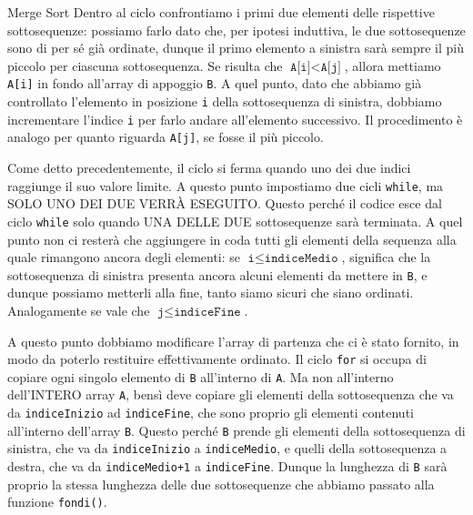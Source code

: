 \documentclass[12pt]{report}
\begin{document}
\begin{algoritmo}{Merge Sort}{}
    	Dentro al ciclo confrontiamo i primi due elementi delle rispettive sottosequenze: possiamo farlo dato che, per ipotesi induttiva, le due sottosequenze sono di per sé già ordinate, dunque il primo elemento a sinistra sarà sempre il più piccolo per ciascuna sottosequenza. Se risulta che $\texttt{A[i]} < \texttt{A[j]}$, allora mettiamo \texttt{A[i]} in fondo all'array di appoggio \texttt{B}. A quel punto, dato che abbiamo già controllato l'elemento in posizione \texttt{i} della sottosequenza di sinistra, dobbiamo incrementare l'indice \texttt{i} per farlo andare all'elemento successivo. Il procedimento è analogo per quanto riguarda \texttt{A[j]}, se fosse il più piccolo.
    	
    	Come detto precedentemente, il ciclo si ferma quando uno dei due indici raggiunge il suo valore limite. A questo punto impostiamo due cicli \texttt{while}, ma SOLO UNO DEI DUE VERRÀ ESEGUITO. Questo perché il codice esce dal ciclo \texttt{while} solo quando UNA DELLE DUE sottosequenze sarà terminata. A quel punto non ci resterà che aggiungere in coda tutti gli elementi della sequenza alla quale rimangono ancora degli elementi: se $\texttt{i} \leq \texttt{indiceMedio}$, significa che la sottosequenza di sinistra presenta ancora alcuni elementi da mettere in \texttt{B}, e dunque possiamo metterli alla fine, tanto siamo sicuri che siano ordinati. Analogamente se vale che $\texttt{j} \leq \texttt{indiceFine}$.
    	
    	A questo punto dobbiamo modificare l'array di partenza che ci è stato fornito, in modo da poterlo restituire effettivamente ordinato. Il ciclo \texttt{for} si occupa di copiare ogni singolo elemento di \texttt{B} all'interno di \texttt{A}. Ma non all'interno dell'INTERO array \texttt{A}, bensì deve copiare gli elementi della sottosequenza che va da \texttt{indiceInizio} ad \texttt{indiceFine}, che sono proprio gli elementi contenuti all'interno dell'array \texttt{B}. Questo perché \texttt{B} prende gli elementi della sottosequenza di sinistra, che va da \texttt{indiceInizio} a \texttt{indiceMedio}, e quelli della sottosequenza a destra, che va da \texttt{indiceMedio+1} a \texttt{indiceFine}. Dunque la lunghezza di \texttt{B} sarà proprio la stessa lunghezza delle due sottosequenze che abbiamo passato alla funzione \texttt{fondi()}.
    	

\end{algoritmo}
\end{document}
